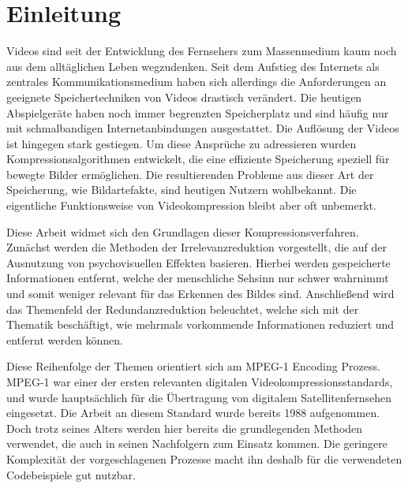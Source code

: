 \chapter{Einleitung} 

Videos sind seit der Entwicklung des Fernsehers zum Massenmedium kaum noch aus dem alltäglichen Leben wegzudenken. Seit dem Aufstieg des Internets als zentrales Kommunikationsmedium haben sich allerdings die Anforderungen an geeignete Speichertechniken von Videos drastisch verändert. Die heutigen Abspielgeräte haben noch immer begrenzten Speicherplatz und sind häufig nur mit schmalbandigen Internetanbindungen ausgestattet. Die Auflösung der Videos ist hingegen stark gestiegen. Um diese Ansprüche zu adressieren wurden Kompressionsalgorithmen entwickelt, die eine effiziente Speicherung speziell für bewegte Bilder ermöglichen. Die resultierenden Probleme aus dieser Art der Speicherung, wie Bildartefakte, sind heutigen Nutzern wohlbekannt. Die eigentliche Funktionsweise von Videokompression bleibt aber oft unbemerkt.

Diese Arbeit widmet sich den Grundlagen dieser Kompressionsverfahren. Zunächst werden die Methoden der Irrelevanzreduktion vorgestellt, die auf der Ausnutzung von psychovisuellen Effekten basieren. Hierbei werden gespeicherte Informationen entfernt, welche der menschliche Sehsinn nur schwer wahrnimmt und somit weniger relevant für das Erkennen des Bildes sind. Anschließend wird das Themenfeld der Redundanzreduktion beleuchtet, welche sich mit der Thematik beschäftigt, wie mehrmals vorkommende Informationen reduziert und entfernt werden können.

Diese Reihenfolge der Themen orientiert sich am MPEG-1 Encoding Prozess. MPEG-1 war einer der ersten relevanten digitalen Videokompressionsstandards, und wurde hauptsächlich für die Übertragung von digitalem Satellitenfernsehen eingesetzt. Die Arbeit an diesem Standard wurde bereits 1988 aufgenommen. Doch trotz seines Alters werden hier bereits die grundlegenden Methoden verwendet, die auch in seinen Nachfolgern zum Einsatz kommen. Die geringere Komplexität der vorgeschlagenen Prozesse macht ihn deshalb für die verwendeten Codebeispiele gut nutzbar.
